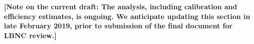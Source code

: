 {\bf [Note on the current draft: The analysis, including calibration and efficiency estimates, is ongoing. We anticipate updating this section in late February 2019, prior to submission of the final document for LBNC review.] }
 
 



